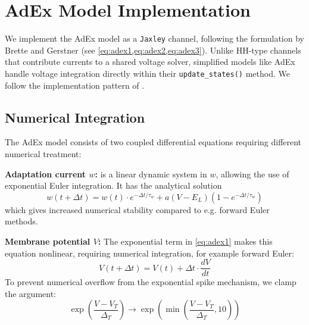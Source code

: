 \section{AdEx Model Implementation}\label{sec:method:adex_impl}
We implement the \gls{AdEx} model as a \texttt{Jaxley} channel, following the formulation by Brette and Gerstner \cite{Brette2005} (see \cref{eq:adex1,eq:adex2,eq:adex3}).
Unlike \gls{HH}-type channels that contribute currents to a shared voltage solver, simplified models like \gls{AdEx} handle voltage integration directly within their \texttt{update\_states()} method.
We follow the implementation pattern of \cite{Deistler2025}.

\subsection{Numerical Integration}\label{sec:method:adex:numerics}
The \gls{AdEx} model consists of two coupled differential equations requiring different numerical treatment:

\textbf{Adaptation current $w$:}
 is a linear dynamic system in $w$, allowing the use of exponential Euler integration.
It has the analytical solution
\begin{equation}\label{eq:adaptation-current-integration}
  w(t+\Delta t) = w(t) \cdot e^{-\Delta t / \tau_w} + a(V - E_L)(1 - e^{-\Delta t / \tau_w})
\end{equation}
which gives increased numerical stability compared to e.g. forward Euler methods.

\textbf{Membrane potential $V$:}
The exponential term in \cref{eq:adex1} makes this equation nonlinear, requiring numerical integration, for example forward Euler:
\begin{equation}
    V(t + \Delta t) = V(t) + \Delta t \cdot \frac{dV}{dt}
\end{equation}
To prevent numerical overflow from the exponential spike mechanism, we clamp the argument:
\begin{equation}
    \exp\left(\frac{V - V_T}{\Delta_T}\right) \rightarrow \exp\left(\min\left(\frac{V - V_T}{\Delta_T}, 10\right)\right)
\end{equation}

